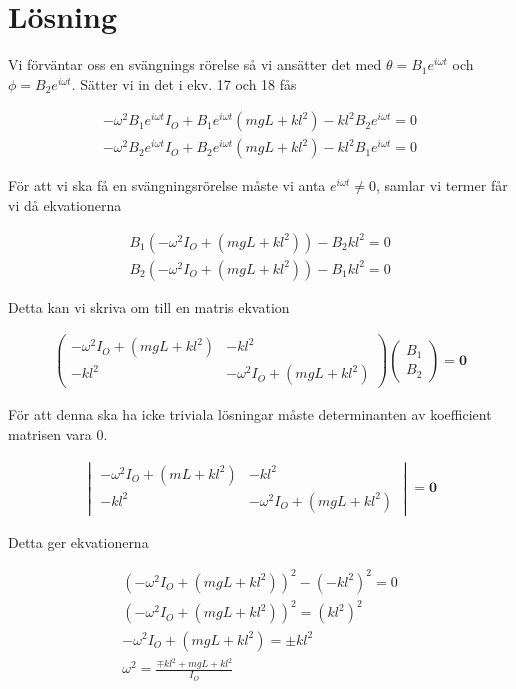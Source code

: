 \documentclass[a4paper]{article}
\begin{document}
\section{Lösning}

Vi förväntar oss en svängnings rörelse så vi ansätter det med $\theta = B_1e^{i\omega t}$ och $\phi = B_2e^{i\omega t}$. Sätter vi in det i ekv. 17 och 18 fås

\begin{align}
    -\omega^2 B_1e^{i\omega t} I_O + B_1e^{i\omega t}(mgL+kl^2) - kl^2 B_2e^{i\omega t} = 0 \\
    -\omega^2 B_2e^{i\omega t} I_O + B_2e^{i\omega t} (mgL+kl^2) - kl^2 B_1e^{i\omega t} = 0
\end{align}

För att vi ska få en svängningsrörelse måste vi anta $e^{i \omega t} \neq 0$, samlar vi termer får vi då ekvationerna

\begin{align}
    B_1(-\omega^2I_O + (mgL+kl^2)) - B_2kl^2 = 0 \\
    B_2(-\omega^2I_O + (mgL+kl^2)) - B_1kl^2 = 0
\end{align}

Detta kan vi skriva om till en matris ekvation

\begin{align}
    \begin{pmatrix}
        -\omega^2I_O + (mgL+kl^2) & -kl^2 \\
        -kl^2 & -\omega^2I_O + (mgL+kl^2)
    \end{pmatrix} \begin{pmatrix}
        B_1 \\
        B_2
    \end{pmatrix} = \mathbf{0}
\end{align}

För att denna ska ha icke triviala lösningar måste determinanten av koefficient matrisen vara 0.

\begin{align}
    \begin{vmatrix}
        -\omega^2I_O + (mL+kl^2) & -kl^2 \\
        -kl^2 & -\omega^2 I_O + (mgL+kl^2)
    \end{vmatrix} = \mathbf{0}
\end{align}

Detta ger ekvationerna

\begin{align}
    (-\omega^2I_O + (mgL+kl^2))^2 - (-kl^2)^2 = 0 \\
    (-\omega^2I_O + (mgL+kl^2))^2 = (kl^2)^2\\
    -\omega^2I_O + (mgL+kl^2) = \pm kl^2 \\
    \omega^2 = \frac{\mp kl^2 + mgL + kl^2}{I_O}
\end{align}
\end{document}
